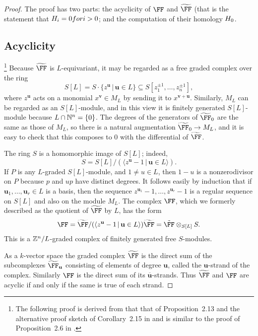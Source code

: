 \documentclass{amsart}
\begin{document}
\begin{proof}
The proof has two parts: the acyclicity of $\FF$ and $\tF$ (that is the statement that $H_i = 0 for i>0$; and the computation of their homology $H_0$.

\subsection{Acyclicity}
\footnote{The following proof is derived from that that of Proposition~2.13 and the alternative proof sketch of Corollary~2.15 in \cite{BCHSY} and is similar to the proof of Proposition~2.6 in \cite{BH25}.}
Because $\tF$ is $L$-equivariant, it may be regarded as a free graded complex over the ring
\[
S[L]=S\cdot \{z^{\mathbf{u}} \,|\, \mathbf{u}\in L\}\subseteq S[z_1^{\pm1},\ldots,z_n^{\pm1}],
\]
where $z^{\mathbf{u}}$ acts on a monomial $x^{\mathbf{v}}\in M_L$ by sending it to $x^{\mathbf{v}+\mathbf{u}}$. Similarly, $M_L$ can be regarded as an $S[L]$-module, and in this view it is finitely generated $S[L]$-module because $L\cap \mathbb N^n=\{0\}$. The degrees of the generators of
$\tF_0$ are the same as those of $M_L$, so there is a natural augmentation $\tF_0\to M_L$, and it is easy to check that this composes to 0 with the differential of $\tF$.

The ring $S$ is a homomorphic image of $S[L]$; indeed,
$$
S = S[L]/(\langle z^{\mathbf{u}}-1 \,|\, \mathbf{u}\in L\rangle).
$$
If $P$ is any $L$-graded $S[L]$-module, and $1 \neq u\in L$, then $1-u$ is a nonzerodivisor on $P$ because $p$ and $up$ have distinct degrees. It follows easily by induction that if $\mathbf{u}_1,\ldots,\mathbf{u}_r\in L$ is a basis, then the sequence $z^{\mathbf{u}_1}-1,\ldots,z^{\mathbf{u}_r}-1$ is a regular sequence on $S[L]$ and also on the module $M_L$. The complex
 $\FF$, which we formerly described as the quotient of $\tF$ by $L$,  has the form
 $$
 \FF = \tF/(\langle z^{\mathbf{u}}-1 \,|\, \mathbf{u}\in L\rangle)\tF =   \tilde \FF \otimes_{S[L]} S.
$$
This is a $\mathbb Z^n/L$-graded complex of finitely generated free $S$-modules.

As a $k$-vector space the graded complex $\tF$ is the direct sum of the subcomplexes $\tF_{\mathbf u}$ consisting of elements of degree $\mathbf u$, called the $\mathbf u$-strand of the complex. Similarly $\FF$ is the direct sum of its $\overline{\mathbf u}$-strands. Thus $\tF$ and $\FF$ are acyclic if and only if the same is true of each strand. 


\end{proof}
\end{document}
